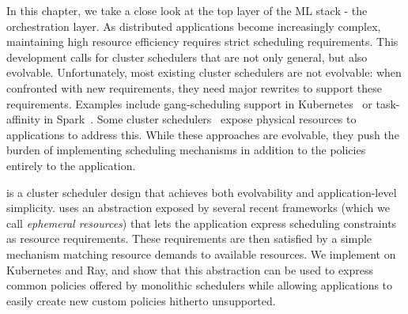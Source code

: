 In this chapter, we take a close look at the top layer of the ML stack - the orchestration layer. As distributed applications become increasingly complex, maintaining high resource efficiency requires strict scheduling requirements. This development calls for cluster schedulers that are not only general, but also evolvable. Unfortunately, most existing cluster schedulers are not evolvable: when confronted with new requirements, they need major rewrites to support these requirements. Examples include gang-scheduling support in Kubernetes~\cite{spark-ganscheduling, kubernetes} or task-affinity in Spark~\cite{spark-ganscheduling}. Some cluster schedulers~\cite{omega,mesos} expose physical resources to applications to address this. While these approaches are evolvable, they push the burden of implementing scheduling mechanisms in addition to the policies entirely to the application.

\name{} is a cluster scheduler design that achieves both evolvability and application-level simplicity. \name{} uses an abstraction exposed by several recent frameworks (which we call \textit{ephemeral resources}) that lets the application express scheduling constraints as resource requirements. These requirements are then satisfied by a simple mechanism matching resource demands to available resources. We implement \name{} on Kubernetes and Ray, and show that this abstraction can be used to express common policies offered by monolithic schedulers while allowing applications to easily create new custom policies hitherto unsupported.